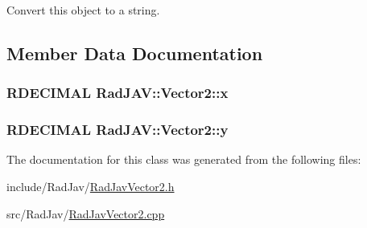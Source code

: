 Convert this object to a string. 



\subsection{Member Data Documentation}
\subsubsection[{\texorpdfstring{x}{x}}]{\setlength{\rightskip}{0pt plus 5cm}R\+D\+E\+C\+I\+M\+AL Rad\+J\+A\+V\+::\+Vector2\+::x}\hypertarget{class_rad_j_a_v_1_1_vector2_a0c7b2ac402b2594c86071930bdb396fe}{}\label{class_rad_j_a_v_1_1_vector2_a0c7b2ac402b2594c86071930bdb396fe}
\subsubsection[{\texorpdfstring{y}{y}}]{\setlength{\rightskip}{0pt plus 5cm}R\+D\+E\+C\+I\+M\+AL Rad\+J\+A\+V\+::\+Vector2\+::y}\hypertarget{class_rad_j_a_v_1_1_vector2_a98eaf64b58e2c602544b1b4e11702e9c}{}\label{class_rad_j_a_v_1_1_vector2_a98eaf64b58e2c602544b1b4e11702e9c}


The documentation for this class was generated from the following files\+:\begin{DoxyCompactItemize}
\item 
include/\+Rad\+Jav/\hyperlink{_rad_jav_vector2_8h}{Rad\+Jav\+Vector2.\+h}\item 
src/\+Rad\+Jav/\hyperlink{_rad_jav_vector2_8cpp}{Rad\+Jav\+Vector2.\+cpp}\end{DoxyCompactItemize}
